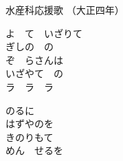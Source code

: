 \documentclass[10pt,b5j]{tarticle} %
\begin{document}
\begin{minipage}[c]{0.7\hsize} %
    \begin{center}
        {\LARGE
            水産科応援歌 %
        }
        {\small 
            （大正四年） %
        }
    \end{center}
\end{minipage}
\begin{minipage}[c]{0.3\hsize} %
    \begin{flushright} %
    \end{flushright}
\end{minipage}

\vspace{1.5em} %
\newcommand{\linespace}{0.5em} %
\newcommand{\blocksize}{0.5\hsize} %
\begin{enumerate} %
    \begin{minipage}[c]{\blocksize}
    
        \vspace{\linespace}
        \item
        よ　て　いざりて\\
        ぎしの　の\\
        ぞ　らさんは\\
        いざやて　の\\
        ラ　ラ　ラ
        
        \vspace{\linespace}
        \item
        のるに\\
        はずやのを\\
        きのりもて\\
        めん　せるを
    
    \end{minipage}
\end{enumerate} %
\end{document}
